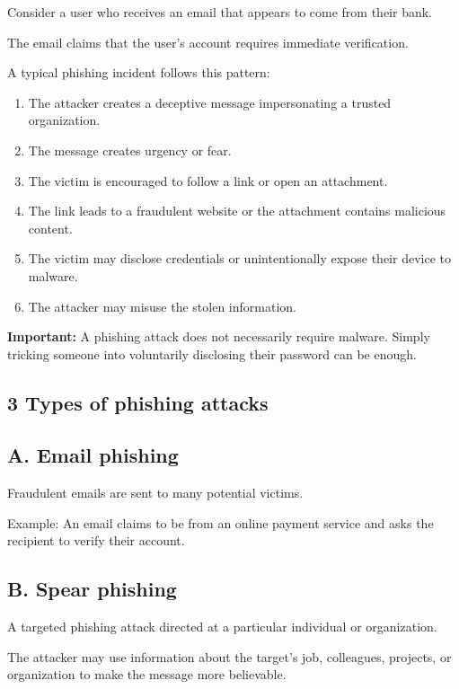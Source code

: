 Consider a user who receives an email that appears to come from their bank.

The email claims that the user's account requires immediate verification.

A typical phishing incident follows this pattern:

\begin{enumerate}
\item The attacker creates a deceptive message impersonating a trusted organization.
\item The message creates urgency or fear.
\item The victim is encouraged to follow a link or open an attachment.
\item The link leads to a fraudulent website or the attachment contains malicious content.
\item The victim may disclose credentials or unintentionally expose their device to malware.
\item The attacker may misuse the stolen information.
\end{enumerate}

\textbf{Important:} A phishing attack does not necessarily require malware. Simply tricking someone into voluntarily disclosing their password can be enough.

\subsection{3 Types of phishing attacks}

\subsection{A. Email phishing}

Fraudulent emails are sent to many potential victims.

Example: An email claims to be from an online payment service and asks the recipient to verify their account.

\subsection{B. Spear phishing}

A targeted phishing attack directed at a particular individual or organization.

The attacker may use information about the target's job, colleagues, projects, or organization to make the message more believable.

